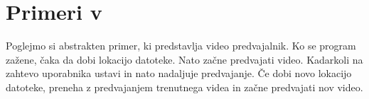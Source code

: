 \section{Primeri v \aeff{}} \label{sec:primeri-aeff}

%
%
% 
%
%
%
%
%







%
%

Poglejmo si abstrakten primer, ki predstavlja video predvajalnik.
Ko se program zažene, čaka da dobi lokacijo datoteke. Nato začne predvajati video. Kadarkoli na zahtevo uporabnika ustavi in nato nadaljuje predvajanje. Če dobi novo lokacijo datoteke, preneha z predvajanjem trenutnega videa in začne predvajati nov video.

